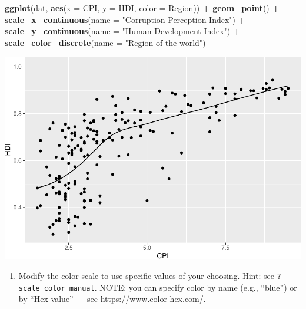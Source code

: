 \documentclass[
]{book}
\newenvironment{Shaded}{\begin{snugshade}}{\end{snugshade}}
\newcommand{\DataTypeTok}[1]{\textcolor[rgb]{0.13,0.29,0.53}{#1}}
\newcommand{\KeywordTok}[1]{\textcolor[rgb]{0.13,0.29,0.53}{\textbf{#1}}}
\newcommand{\NormalTok}[1]{#1}
\newcommand{\OperatorTok}[1]{\textcolor[rgb]{0.81,0.36,0.00}{\textbf{#1}}}
\newcommand{\StringTok}[1]{\textcolor[rgb]{0.31,0.60,0.02}{#1}}
\providecommand{\tightlist}{%
  \setlength{\itemsep}{0pt}\setlength{\parskip}{0pt}}
\begin{document}
\begin{alert}
\begin{Shaded}
\begin{Highlighting}[]
\KeywordTok{ggplot}\NormalTok{(dat, }\KeywordTok{aes}\NormalTok{(}\DataTypeTok{x =}\NormalTok{ CPI, }\DataTypeTok{y =}\NormalTok{ HDI, }\DataTypeTok{color =}\NormalTok{ Region)) }\OperatorTok{+}
\StringTok{  }\KeywordTok{geom\_point}\NormalTok{() }\OperatorTok{+}
\StringTok{  }\KeywordTok{scale\_x\_continuous}\NormalTok{(}\DataTypeTok{name =} \StringTok{"Corruption Perception Index"}\NormalTok{) }\OperatorTok{+}
\StringTok{  }\KeywordTok{scale\_y\_continuous}\NormalTok{(}\DataTypeTok{name =} \StringTok{"Human Development Index"}\NormalTok{) }\OperatorTok{+}
\StringTok{  }\KeywordTok{scale\_color\_discrete}\NormalTok{(}\DataTypeTok{name =} \StringTok{"Region of the world"}\NormalTok{)}
\end{Highlighting}
\end{Shaded}

\includegraphics{R/Rgraphics/figures/unnamed-chunk-206-1.pdf}

\begin{enumerate}
\def\labelenumi{\arabic{enumi}.}
\setcounter{enumi}{2}
\tightlist
\item
  Modify the color scale to use specific values of your choosing. Hint: see \texttt{?scale\_color\_manual}. NOTE: you can specify color by name (e.g., ``blue'') or by ``Hex value'' --- see \url{https://www.color-hex.com/}.
\end{enumerate}


\end{alert}
\end{document}
